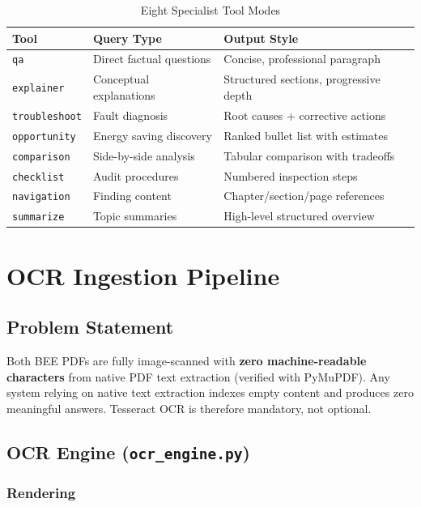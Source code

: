 \documentclass[12pt,a4paper]{report}
\begin{document}
\begin{table}[H]
\centering
\caption{Eight Specialist Tool Modes}
\begin{tabularx}{\textwidth}{@{}llX@{}}
\toprule
\textbf{Tool} & \textbf{Query Type} & \textbf{Output Style} \\
\midrule
\texttt{qa} & Direct factual questions & Concise, professional paragraph \\
\texttt{explainer} & Conceptual explanations & Structured sections, progressive depth \\
\texttt{troubleshoot} & Fault diagnosis & Root causes + corrective actions \\
\texttt{opportunity} & Energy saving discovery & Ranked bullet list with estimates \\
\texttt{comparison} & Side-by-side analysis & Tabular comparison with tradeoffs \\
\texttt{checklist} & Audit procedures & Numbered inspection steps \\
\texttt{navigation} & Finding content & Chapter/section/page references \\
\texttt{summarize} & Topic summaries & High-level structured overview \\
\bottomrule
\end{tabularx}
\end{table}

\chapter{OCR Ingestion Pipeline}

\section{Problem Statement}

Both BEE PDFs are fully image-scanned with \textbf{zero machine-readable characters} from native PDF text extraction (verified with PyMuPDF). Any system relying on native text extraction indexes empty content and produces zero meaningful answers. Tesseract OCR is therefore mandatory, not optional.

\section{OCR Engine (\texttt{ocr\_engine.py})}

\subsection{Rendering}
\end{document}
